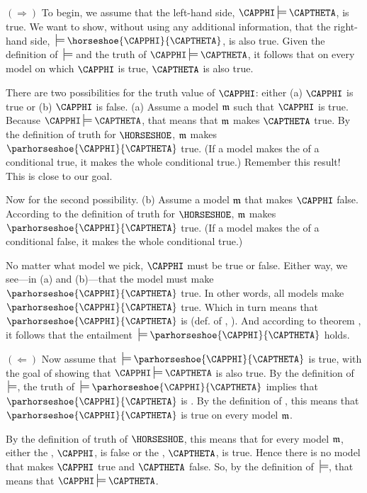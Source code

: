 \begin{PROOF}
$(\Rightarrow)$ To begin, we assume that the left-hand side, $\CAPPHI\sdtstile{}{}\CAPTHETA$, is true.  We want to show, without using any additional information, that the right-hand side, $\:\sdtstile{}{}\horseshoe{\CAPPHI}{\CAPTHETA}$, is also true.  Given the definition of $\:\sdtstile{}{}$ and the truth of $\CAPPHI\sdtstile{}{}\CAPTHETA$, it follows that on every model on which $\CAPPHI$ is true, $\CAPTHETA$ is also true.

There are two possibilities for the truth value of $\CAPPHI$: either (a) $\CAPPHI$ is true or (b) $\CAPPHI$ is false.  (a) Assume a model $\mathfrak{m}$ such that $\CAPPHI$ is true.  Because $\CAPPHI\sdtstile{}{}\CAPTHETA$, that means that $\mathfrak{m}$ makes $\CAPTHETA$ true.  By the definition of truth for $\HORSESHOE$, $\mathfrak{m}$ makes $\parhorseshoe{\CAPPHI}{\CAPTHETA}$ true.  (If a model makes the  of a conditional true, it makes the whole conditional true.)  Remember this result!  This is close to our goal.

Now for the second possibility.  (b) Assume a model $\mathfrak{m}$ that makes $\CAPPHI$ false.  According to the definition of truth for $\HORSESHOE$, $\mathfrak{m}$ makes $\parhorseshoe{\CAPPHI}{\CAPTHETA}$ true. (If a model makes the  of a conditional false, it makes the whole conditional true.)

No matter what model we pick, $\CAPPHI$ must be true or false.  Either way, we see---in (a) and (b)---that the model must make $\parhorseshoe{\CAPPHI}{\CAPTHETA}$ true.  In other words, all models make $\parhorseshoe{\CAPPHI}{\CAPTHETA}$ true.  Which in turn means that $\parhorseshoe{\CAPPHI}{\CAPTHETA}$ is  (def. of , ).  And according to theorem , it follows that the entailment $\:\sdtstile{}{}\parhorseshoe{\CAPPHI}{\CAPTHETA}$ holds.  

$(\Leftarrow)$ Now assume that $\:\sdtstile{}{}\parhorseshoe{\CAPPHI}{\CAPTHETA}$ is true, with the goal of showing that $\CAPPHI\sdtstile{}{}\CAPTHETA$ is also true.  By the definition of $\:\sdtstile{}{}$, the truth of $\:\sdtstile{}{}\parhorseshoe{\CAPPHI}{\CAPTHETA}$ implies that $\parhorseshoe{\CAPPHI}{\CAPTHETA}$ is .  By the definition of , this means that $\parhorseshoe{\CAPPHI}{\CAPTHETA}$ is true on every model $\mathfrak{m}$.

By the definition of truth of $\HORSESHOE$, this means that for every model $\mathfrak{m}$, either the , $\CAPPHI$, is false or the , $\CAPTHETA$, is true.  Hence there is no model that makes $\CAPPHI$ true and $\CAPTHETA$ false.  So, by the definition of $\:\sdtstile{}{}$, that means that $\CAPPHI\sdtstile{}{}\CAPTHETA$.
\end{PROOF}

